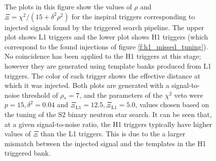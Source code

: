 \begin{figure}[p]
\begin{center}
\end{center}
\caption[Illustration of Tuning Based on Injections]{%
\label{f:h1_inj_xi_tuning}%
The plots in this figure show the values of $\rho$ and $\Xi = \chi^2/(15 +
\delta^2\rho^2)$ for the inspiral triggers corresponding to injected signals
found by the triggered search pipeline. The upper plot shows L1 triggers and
the lower plot shows H1 triggers (which correspond to the found injections of
figure \ref{f:h1_missed_tuning}). No coincidence has been applied to the H1
triggers at this stage; however they are generated using template banks
produced from L1 triggers. The color of each trigger shows the effective
distance at which it was injected.  Both plots are generated with a
signal-to-noise threshold of $\rho_\ast = 7$, and the parameters of the
$\chi^2$ veto were $p = 15, \delta^2 = 0.04$ and $\Xi_\mathrm{L1} = 12.5,
\Xi_\mathrm{L1} = 5.0$, values chosen based on the tuning of the S2 binary
neutron star search. It can be seen that, at a given signal-to-noise ratio,
the H1 triggers typically have higher values of $\Xi$ than the L1 triggers.
This is due to the a larger mismatch between the injected signal and the
templates in the H1 triggered bank.
}
\end{figure}

